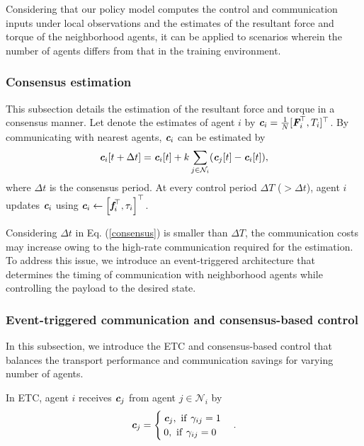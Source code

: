 \documentclass[letterpaper, 10 pt, conference]{ieeeconf} %
\begin{document}
Considering that our policy model computes the control and communication inputs under local observations and the estimates of the resultant force and torque of the neighborhood agents, it can be applied to scenarios wherein the number of agents differs from that in the training environment.

\subsubsection{Consensus estimation}
This subsection details the estimation of the resultant force and torque in a consensus manner.
Let denote the estimates of agent $i$ by $\textit{\textbf{c}}_i=\frac{1}{N}[\textit{\textbf{F}}_i^{\top}, T_i]^{\top}$.
By communicating with nearest agents, $\textit{\textbf{c}}_i$ can be estimated by
\begin{eqnarray}
\textit{\textbf{c}}_i[t+\Delta t]=\textit{\textbf{c}}_i[t]+k \sum_{j\in \mathcal{N}_i}(\textit{\textbf{c}}_j[t]-\textit{\textbf{c}}_i[t]),
\label{consensus}
\end{eqnarray}
where $\Delta t$ is the consensus period.
At every control period $\Delta T$ ($>\Delta t$), agent $i$ updates $\textit{\textbf{c}}_i$ using $\textit{\textbf{c}}_i\leftarrow \left[\textit{\textbf{f}}_i^{\top}, \tau_i\right]^{\top}$.

Considering $\Delta t$ in Eq. (\ref{consensus}) is smaller than $\Delta T$, the communication costs may increase owing to the high-rate communication required for the estimation.
To address this issue, we introduce an event-triggered architecture that determines the timing of communication with neighborhood agents while controlling the payload to the desired state.

\subsubsection{Event-triggered communication and consensus-based control}
In this subsection, we introduce the ETC and consensus-based control that balances the transport performance and communication savings for varying number of agents.

In ETC, agent $i$ receives $\textit{\textbf{c}}_j$ from agent $j\in \mathcal{N}_i$ by
\begin{eqnarray}
\textit{\textbf{c}}_j=
\begin{cases}
\textit{\textbf{c}}_j,\ {\rm if}\ \gamma_{ij}=1 \\
0,\ {\rm if}\ \gamma_{ij}=0
\end{cases}.
\label{ETC}
\end{eqnarray}
\end{document}
